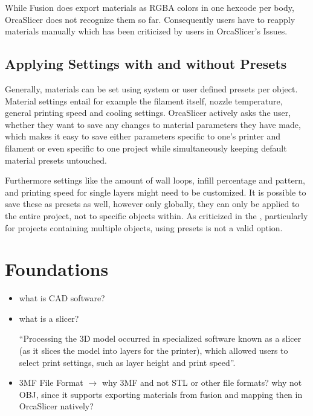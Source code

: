 While Fusion does export materials as RGBA colors in one hexcode per body, OrcaSlicer does not recognize them so far. 
Consequently users have to reapply materials manually which has been criticized by users in OrcaSlicer's Issues.\cite{sheminasalam_single_nodate}

\subsection{Applying Settings with and without Presets}

Generally, materials can be set using system or user defined presets per object. 
Material settings entail for example the filament itself, nozzle temperature, general printing speed and cooling settings.
OrcaSlicer actively asks the user, whether they want to save any changes to material parameters they have made, which makes it easy to save either parameters specific to one's printer and filament or even specific to one project while simultaneously keeping default material presets untouched.

Furthermore settings like the amount of wall loops, infill percentage and pattern, and printing speed for single layers might need to be customized. 
It is possible to save these as presets as well, however only globally, \ie they can only be applied to the entire project, not to specific objects within.
As criticized in the \cite[OrcaSlicer Issue \#7769]{headamame_copypaste_2024}, particularly for projects containing multiple objects, using presets is not a valid option.


\section{Foundations}
\begin{itemize}
    \item what is CAD software?
    \item what is a slicer?

    ``Processing the 3D model occurred in specialized software known as a slicer (as it slices the model into layers for the printer), which allowed users to select print settings, such as layer height and print speed''\cite{hudson_understanding_2016}.
    \item 3MF File Format $\rightarrow$ why 3MF and not STL or other file formats? why not OBJ, since it supports exporting materials from fusion and mapping then in OrcaSlicer natively?
\end{itemize}

